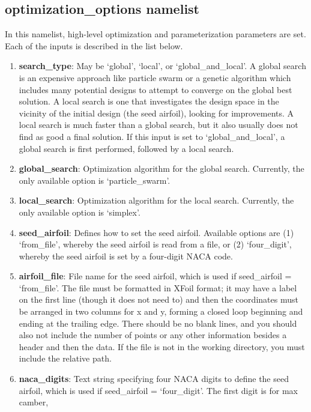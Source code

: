 \documentclass[11pt]{article}
\begin{document}
\subsection{optimization\_options namelist}

In this namelist, high-level optimization and parameterization parameters are set.  Each
of the inputs is described in the list below.

\begin{enumerate}
\item{\textbf{search\_type}: May be `global', `local', or `global\_and\_local'.
A global search is an expensive approach like particle swarm or a genetic algorithm which
includes many potential designs to attempt to converge on the global best solution.  A
local search is one that investigates the design space in the vicinity of the initial
design (the seed airfoil), looking for improvements.  A local search is much faster than
a global search, but it also usually does not find as good a final solution.  If this
input is set to `global\_and\_local', a global search is first performed, followed by a
local search.}
\item{\textbf{global\_search}: Optimization algorithm for the global search.  Currently,
the only available option is `particle\_swarm'.}
\item{\textbf{local\_search}: Optimization algorithm for the local search.  Currently, the
only available option is `simplex'.}
\item{\textbf{seed\_airfoil}: Defines how to set the seed airfoil.  Available options are
(1) `from\_file', whereby the seed airfoil is read from a file, or (2) `four\_digit',
whereby the seed airfoil is set by a four-digit NACA code.}
\item{\textbf{airfoil\_file}: File name for the seed airfoil, which is used if
seed\_airfoil = `from\_file'.  The file must be formatted in XFoil format; it may have a
label on the first line (though it does not need to) and then the coordinates must be
arranged in two columns for x and y, forming a closed loop beginning and ending at the
trailing edge. There should be no blank lines, and you should also not include the number
of points or any other information besides a header and then the data.  If the file is not 
in the working directory, you must include the relative path.}
\item{\textbf{naca\_digits}: Text string specifying four NACA digits to define the seed
airfoil, which is used if seed\_airfoil = `four\_digit'.  The first digit is for max camber,
}
\end{enumerate}
\end{document}
